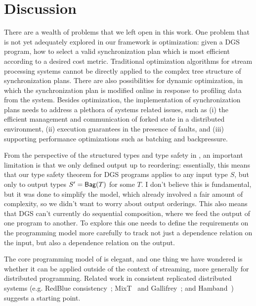 \section{Discussion}
\label{dgs:sec:conclusion}

There are a wealth of problems that we left open in this work.
One problem that is not yet adequately explored in our framework is optimization:
given a DGS program, how to select a valid synchronization plan which is most efficient according to a desired cost metric.
Traditional optimization algorithms for stream processing systems cannot be directly applied to
the complex tree structure of synchronization plans.
There are also possibilities for
dynamic optimization, in which the synchronization plan is modified online in response to profiling data from the system.
Besides optimization, the implementation of synchronization plans needs to address a plethora of systems related issues, such as (i) the efficient management and communication of forked state in a distributed environment, (ii) execution guarantees in the presence of faults, and (iii) supporting performance optimizations such as batching and backpressure.

From the perspective of the structured types and type safety in ,
an important limitation is that we only defined output up to reordering: essentially, this means that our type safety theorem for DGS programs applies to any input type $S$, but only to output types $S' = \mathsf{Bag}({T})$ for some $T$.
I don't believe this is fundamental, but it was done to simplify the model, which already involved a fair amount of complexity, so we didn't want to worry about output orderings.
This also means that DGS can't currently do sequential composition,
where we feed the output of one program to another.
To explore this one needs to define the requirements on the programming model more carefully to track not just a dependence relation on the input, but also a dependence relation on the output.

The core programming model of  is elegant, and one thing we have wondered is whether it can be applied outside of the context of streaming, more generally for distributed programming. Related work in consistent replicated distributed systems
(e.g. RedBlue consistency~\cite{li2012making};
MixT~\cite{milano2018mixt} and Gallifrey~\cite{milano2019tour};
and Hamband~\cite{houshmand2022hamband})
suggests a starting point.
